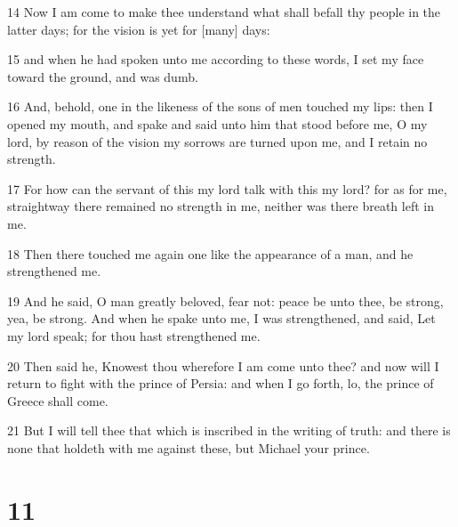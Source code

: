 \par 14 Now I am come to make thee understand what shall befall thy people in the latter days; for the vision is yet for [many] days:
\par 15 and when he had spoken unto me according to these words, I set my face toward the ground, and was dumb.
\par 16 And, behold, one in the likeness of the sons of men touched my lips: then I opened my mouth, and spake and said unto him that stood before me, O my lord, by reason of the vision my sorrows are turned upon me, and I retain no strength.
\par 17 For how can the servant of this my lord talk with this my lord? for as for me, straightway there remained no strength in me, neither was there breath left in me.
\par 18 Then there touched me again one like the appearance of a man, and he strengthened me.
\par 19 And he said, O man greatly beloved, fear not: peace be unto thee, be strong, yea, be strong. And when he spake unto me, I was strengthened, and said, Let my lord speak; for thou hast strengthened me.
\par 20 Then said he, Knowest thou wherefore I am come unto thee? and now will I return to fight with the prince of Persia: and when I go forth, lo, the prince of Greece shall come.
\par 21 But I will tell thee that which is inscribed in the writing of truth: and there is none that holdeth with me against these, but Michael your prince.

\chapter{11}

